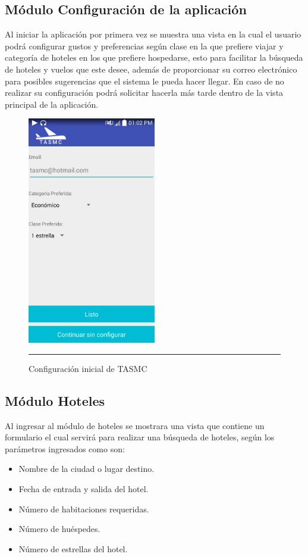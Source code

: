 \subsection{Módulo Configuración de la aplicación}
Al iniciar la aplicación por primera vez se muestra una vista en la cual el usuario podrá configurar gustos y preferencias según clase en la que prefiere viajar y categoría de hoteles en los que prefiere hospedarse, esto para facilitar la búsqueda de hoteles y vuelos que este desee, 
además de proporcionar su correo electrónico para posibles sugerencias que el sistema le pueda hacer llegar.
En caso de no realizar su configuración podrá solicitar hacerla más tarde dentro de la vista principal de la aplicación.
\begin{figure}[h]
	\centering
		\includegraphics[width=0.5\textwidth]{Figuras/configuracion.png}
		\rule{30em}{0.5pt}
	\caption[Configuración inicial de TASMC]{Configuración inicial de TASMC}
	\label{fig:configuracionTASMC}
\end{figure}
\clearpage

\subsection{Módulo Hoteles}
Al ingresar al módulo de hoteles se mostrara una vista que contiene un formulario el cual servirá para realizar una búsqueda de hoteles, según los parámetros ingresados como son:

\begin{itemize}
\item Nombre de la ciudad o lugar destino.
\item Fecha de entrada y salida del hotel.
\item Número de habitaciones requeridas.
\item Número de huéspedes.
\item Número de estrellas del hotel.
\end{itemize}

